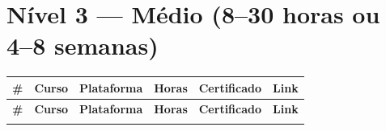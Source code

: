 \documentclass[11pt,a4paper]{article}
\begin{document}
\clearpage
\section*{Nível 3 --- Médio (8--30 horas ou 4--8 semanas)}

\footnotesize
\begin{longtable}{@{}p{0.5cm}p{4.6cm}p{2.6cm}p{1.8cm}p{2.2cm}p{2.0cm}@{}}
\rowcolor{gray!10}
\textbf{\#} & \textbf{Curso} & \textbf{Plataforma} & \textbf{Horas} & \textbf{Certificado} & \textbf{Link} \\
\midrule
\endfirsthead
\rowcolor{gray!10}
\textbf{\#} & \textbf{Curso} & \textbf{Plataforma} & \textbf{Horas} & \textbf{Certificado} & \textbf{Link} \\
\midrule
\endhead
\bottomrule
\endfoot
\bottomrule
\endlastfoot


\end{longtable}
\end{document}
